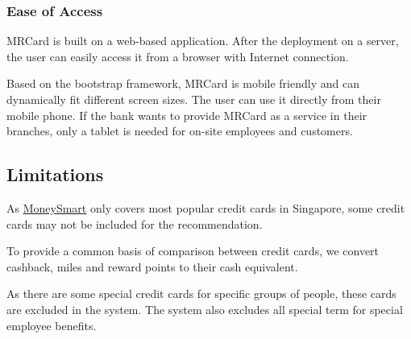 	\subsubsection{Ease of Access} %
	\label{ssub:ease_of_access}

	MRCard is built on a web-based application. After the deployment on a server, the user can easily access it from a browser with Internet connection.

	Based on the bootstrap framework, MRCard is mobile friendly and can dynamically fit different screen sizes. The user can use it directly from their mobile phone. If the bank wants to provide MRCard as a service in their branches, only a tablet is needed for on-site employees and customers.



\subsection{Limitations} %
\label{sub:limitations}

As \href{https://www.moneysmart.sg/credit-cards}{MoneySmart} only covers most popular credit cards in Singapore, some credit cards may not be included for the recommendation.

To provide a common basis of comparison between credit cards, we convert cashback, miles and reward points to their cash equivalent.

As there are some special credit cards for specific groups of people, these cards are excluded in the system. The system also excludes all special term for special employee benefits.

